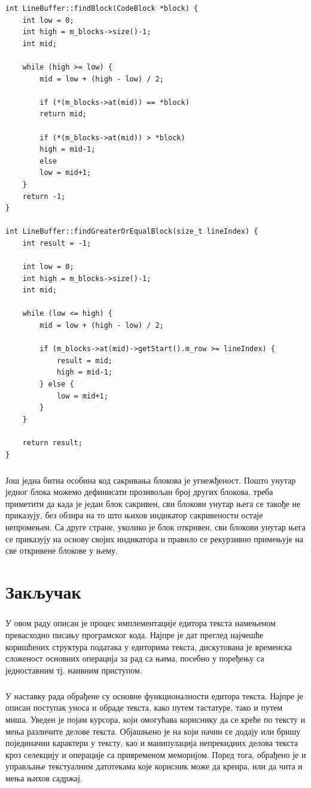 \documentclass[12pt,oneside]{memoir}
\begin{document}
\begin{verbatim}
int LineBuffer::findBlock(CodeBlock *block) {
	int low = 0;
	int high = m_blocks->size()-1;
	int mid;
	
	while (high >= low) {
		mid = low + (high - low) / 2;
		
		if (*(m_blocks->at(mid)) == *block)
		return mid;
		
		if (*(m_blocks->at(mid)) > *block)
		high = mid-1;
		else
		low = mid+1;
	}
	return -1;
}

int LineBuffer::findGreaterOrEqualBlock(size_t lineIndex) {
	int result = -1;
	
	int low = 0;
	int high = m_blocks->size()-1;
	int mid;
	
	while (low <= high) {
		mid = low + (high - low) / 2;
		
		if (m_blocks->at(mid)->getStart().m_row >= lineIndex) {
			result = mid;
			high = mid-1;
		} else {
			low = mid+1;
		}
	}
	
	return result;
}
\end{verbatim}

\paragraph{}
Још једна битна особина код сакривања блокова је угнежђеност. Пошто унутар једног
блока можемо дефинисати прозивољан број других блокова, треба приметити да када је
један блок сакривен, сви блокови унутар њега се такође не приказују, без обзира
на то што њихов индикатор сакривености остаје непромењен. Са друге стране, уколико
је блок откривен, сви блокови унутар њега се приказују на основу својих индикатора и правило се рекурзивно примењује на све откривене блокове у њему.  

\chapter{Закључак}

\paragraph{}
У овом раду описан је процес имплементације едитора текста намењеном
превасходно писању програмског кода. Најпре је дат преглед најчешће
коришћених структура података у едиторима текста, дискутована је
временска сложеност основних операција за рад са њима, посебно у поређењу
са једноставним тј. наивним приступом.

\paragraph{}
У наставку рада обрађене су основне функционалности едитора текста.
Најпре је описан поступак уноса и обраде текста, како путем тастатуре, тако и путем миша. Уведен је појам курсора,
који омогућава кориснику да се креће по тексту и мења различите делове
текста. Објашњено је на који начин се додају или бришу појединачни карактери у тексту, као и манипулација непрекидних делова текста кроз
селекцију и операције са привременом меморијом. Поред тога, обрађено је и управљање
текстуалним датотекама које корисник може да креира, или да чита и мења
њихов садржај.
\end{document}

